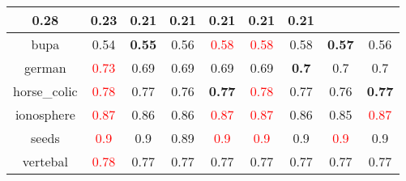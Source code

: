 \documentclass{article}%
\begin{document}
\begin{tabular}{c|cccccccc}
{0.28
}&\textbf{0.23}&0.21&0.21&0.21&0.21&0.21\\%
\hline%
bupa&0.54&\textbf{0.55}&0.56&\textcolor{red}{ 
0.58
}&\textcolor{red}{ 
0.58
}&0.58&\textbf{0.57}&0.56\\%
\hline%
german&\textcolor{red}{ 
0.73
}&0.69&0.69&0.69&0.69&\textbf{0.7}&0.7&0.7\\%
\hline%
horse\_colic&\textcolor{red}{ 
0.78
}&0.77&0.76&\textbf{0.77}&\textcolor{red}{ 
0.78
}&0.77&0.76&\textbf{0.77}\\%
\hline%
ionosphere&\textcolor{red}{ 
0.87
}&0.86&0.86&\textcolor{red}{ 
0.87
}&\textcolor{red}{ 
0.87
}&0.86&0.85&\textcolor{red}{ 
0.87
}\\%
\hline%
seeds&\textcolor{red}{ 
0.9
}&0.9&0.89&\textcolor{red}{ 
0.9
}&\textcolor{red}{ 
0.9
}&0.9&\textcolor{red}{ 
0.9
}&0.9\\%
\hline%
vertebal&\textcolor{red}{ 
0.78
}&0.77&0.77&0.77&0.77&0.77&0.77&0.77\\%
\hline%
\end{tabular}

%
\end{document}
